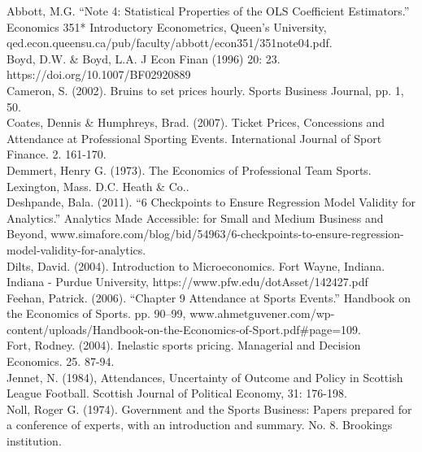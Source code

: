 \documentclass[preprint,12pt,times]{elsarticle}
\begin{document}
\noindent Abbott, M.G. “Note 4: Statistical Properties of the OLS Coefficient Estimators.” Economics 351* Introductory Econometrics, Queen's University, qed.econ.queensu.ca/pub/faculty/abbott/econ351/351note04.pdf.\\

\noindent Boyd, D.W. & Boyd, L.A. J Econ Finan (1996)  20: 23. https://doi.org/10.1007/BF02920889\\

\noindent Cameron, S. (2002). Bruins to set prices hourly. Sports Business Journal, pp. 1,
50.\\

\noindent Coates, Dennis \& Humphreys, Brad. (2007). Ticket Prices, Concessions and Attendance at Professional Sporting Events. International Journal of Sport Finance. 2. 161-170.\\

\noindent Demmert, Henry G. (1973). The Economics of Professional Team Sports. Lexington, Mass. D.C. Heath & Co..\\ 

\noindent Deshpande, Bala. (2011). “6 Checkpoints to Ensure Regression Model Validity for Analytics.” Analytics Made Accessible: for Small and Medium Business and Beyond,
www.simafore.com/blog/bid/54963/6-checkpoints-to-ensure-regression-model-validity-for-analytics.\\

\noindent Dilts, David. (2004). Introduction to Microeconomics. Fort Wayne, Indiana.  Indiana - Purdue University,
https://www.pfw.edu/dotAsset/142427.pdf
\\ 
 
\noindent Feehan, Patrick. (2006).  “Chapter 9 Attendance at Sports Events.” Handbook on the Economics of Sports. pp. 90–99, 
www.ahmetguvener.com/wp-content/uploads/Handbook-on-the-Economics-of-Sport.pdf#page=109.\\

\noindent Fort, Rodney. (2004). Inelastic sports pricing. Managerial and Decision Economics. 25. 87-94.\\

\noindent Jennet, N. (1984), Attendances, Uncertainty of Outcome and Policy in Scottish League Football.  Scottish Journal of Political Economy, 31: 176-198.\\

\noindent Noll, Roger G. (1974). Government and the Sports Business: Papers prepared for a conference of experts, with an introduction and summary. No. 8. Brookings institution.\\
\end{document}

